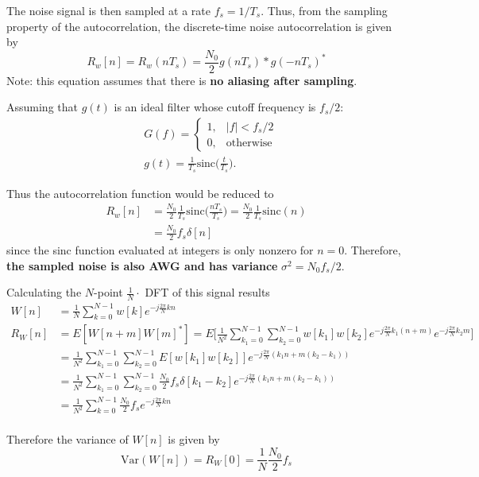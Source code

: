 \documentclass[a4paper]{article}
\begin{document}
The noise signal is then sampled at a rate $f_s = 1/T_s$. Thus, from the sampling property of the autocorrelation, the discrete-time noise autocorrelation is given by
\begin{equation}
R_w[n] = R_w(nT_s) = \frac{N_0}{2}g(nT_s)*g(-nT_s)^*
\end{equation}
Note: this equation assumes that there is \textbf{no aliasing after sampling}.

Assuming that $g(t)$ is an ideal filter whose cutoff frequency is $f_s/2$:
\begin{align}
& G(f) = \begin{cases}
1, & |f| < f_s/2 \\
0, & \mathrm{otherwise}
\end{cases} \\
& g(t) = \frac{1}{T_s}\mathrm{sinc}\Big(\frac{t}{T_s}\Big).
\end{align}

Thus the autocorrelation function would be reduced to
\begin{align} \nonumber
R_w[n] & = \frac{N_0}{2}\frac{1}{T_s}\mathrm{sinc}\Big(\frac{nT_s}{T_s}\Big) = \frac{N_0}{2}\frac{1}{T_s}\mathrm{sinc}(n) \\  
& = \frac{N_0}{2}f_s\delta[n]
\end{align}
since the sinc function evaluated at integers is only nonzero for $n = 0$. Therefore, \textbf{the sampled noise is also AWG and has variance} $\sigma^2 = N_0f_s/2$. 

Calculating the $N$-point $\frac{1}{N}\cdot$ DFT of this signal results
\begin{align}
W[n] &= \frac{1}{N}\sum_{k = 0}^{N-1}w[k]e^{-j\frac{2\pi}{N}kn} \\
R_W[n] & = E[W[n+m]W[m]^*] = E\bigg[\frac{1}{N^2}\sum_{k_1 = 0}^{N-1}\sum_{k_2 = 0}^{N-1}w[k_1]w[k_2]e^{-j\frac{2\pi}{N}k_1(n+m)}e^{-j\frac{2\pi}{N}k_2m}\bigg] \\
& = \frac{1}{N^2}\sum_{k_1 = 0}^{N-1}\sum_{k_2 = 0}^{N-1}E[w[k_1]w[k_2]]e^{-j\frac{2\pi}{N}(k_1n + m(k_2-k_1))} \\
& = \frac{1}{N^2}\sum_{k_1 = 0}^{N-1}\sum_{k_2 = 0}^{N-1}\frac{N_0}{2}f_s\delta[k_1-k_2]e^{-j\frac{2\pi}{N}(k_1n + m(k_2-k_1))} \\
& = \frac{1}{N^2}\sum_{k = 0}^{N-1}\frac{N_0}{2}f_se^{-j\frac{2\pi}{N}kn} \\
\end{align}

Therefore the variance of $W[n]$ is given by
\begin{equation}
\mathrm{Var}(W[n]) = R_W[0] = \frac{1}{N}\frac{N_0}{2}f_s
\end{equation}
\end{document}
